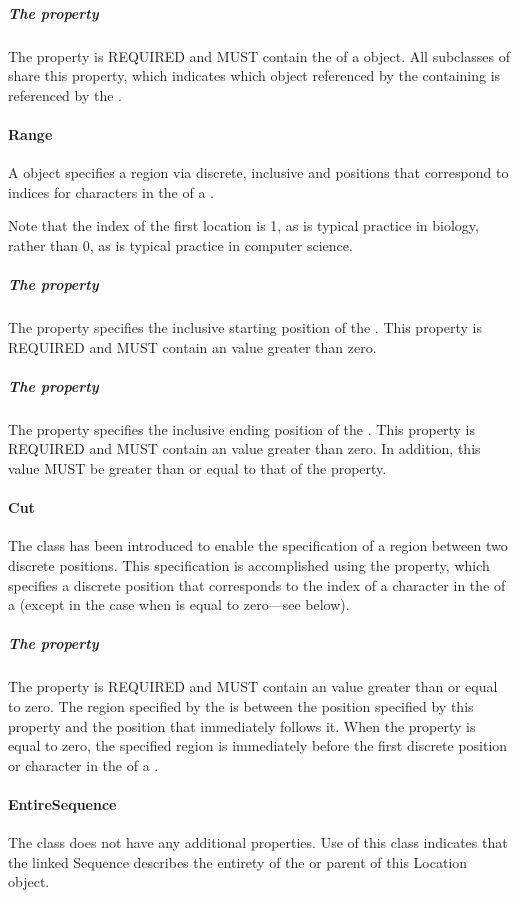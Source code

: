 \subparagraph{The  property}
\label{sec:hasSequence}
The  property is REQUIRED and MUST contain the  of a  object. All subclasses of  share this property, which indicates which  object referenced by the containing  is referenced by the .

\paragraph{Range}
\label{sec:Range}
A  object specifies a region via discrete, inclusive  and  positions that correspond to indices for characters in the   of a .

Note that the index of the first location is 1, as is typical practice in biology, rather than 0, as is typical practice in computer science.

\subparagraph{The  property}\label{sec:start}
The  property specifies the inclusive starting position of the . This property is REQUIRED and MUST contain an  value greater than zero.

\subparagraph{The  property}\label{sec:end}
The  property specifies the inclusive ending position of the . This property is REQUIRED and MUST contain an  value greater than zero. In addition, this  value MUST be greater than or equal to that of the  property.

\paragraph{Cut}
\label{sec:Cut}
The  class has been introduced to enable the specification of a region between two discrete positions.
This specification is accomplished using the  property, which specifies a discrete position that corresponds to the index of a character in the   of a  (except in the case when  is equal to zero---see below).

\subparagraph{The  property}
\label{sec:at}
The  property is REQUIRED and MUST contain an  value greater than or equal to zero. The region specified by the  is between the position specified by this property and the position that immediately follows it. When the  property is equal to zero, the specified region is immediately before the first discrete position or character in the   of a .


\paragraph{EntireSequence}
\label{sec:EntireSequence}
The  class does not have any additional properties. Use of this class indicates that the linked Sequence describes the entirety of the  or  parent of this Location object.

